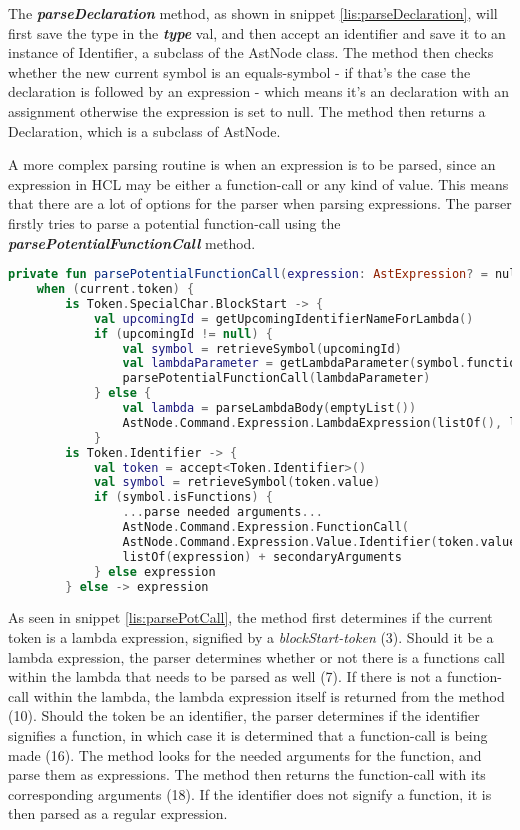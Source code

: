 The \textbf{\textit{parseDeclaration}} method, as shown in snippet \ref{lis:parseDeclaration}, will first save the type in the \textbf{\textit{type}} val, and then accept an identifier and save it to an instance of Identifier, a subclass of the AstNode class. 
The method then checks whether the new current symbol is an equals-symbol - if that's the case the declaration is followed by an expression - which means it's an declaration with an assignment otherwise the expression is set to null. 
The method then returns a Declaration, which is a subclass of AstNode.  

A more complex parsing routine is when an expression is to be parsed, since an expression in HCL may be either a function-call or any kind of value.
This means that there are a lot of options for the parser when parsing expressions.
The parser firstly tries to parse a potential function-call using the \textbf{\textit{parsePotentialFunctionCall}} method.

\begin{lstlisting}[language=Kotlin,label=lis:parsePotCall,caption=A simplified version of the parsePotentialFunctionCall method from the parser.]
private fun parsePotentialFunctionCall(expression: AstExpression? = null): AstExpression =
    when (current.token) {
        is Token.SpecialChar.BlockStart -> {
            val upcomingId = getUpcomingIdentifierNameForLambda()
            if (upcomingId != null) {
                val symbol = retrieveSymbol(upcomingId)
                val lambdaParameter = getLambdaParameter(symbol.functions, 0)
                parsePotentialFunctionCall(lambdaParameter)
            } else {
                val lambda = parseLambdaBody(emptyList())
                AstNode.Command.Expression.LambdaExpression(listOf(), lambda.type, lambda.lambdaBody)
            }
        is Token.Identifier -> {
            val token = accept<Token.Identifier>()
            val symbol = retrieveSymbol(token.value)
            if (symbol.isFunctions) {
        	    ...parse needed arguments...
        	    AstNode.Command.Expression.FunctionCall(
        	    AstNode.Command.Expression.Value.Identifier(token.value),
        	    listOf(expression) + secondaryArguments
            } else expression
        } else -> expression
\end{lstlisting}

As seen in snippet \ref{lis:parsePotCall}, the method first determines if the current token is a lambda expression, signified by a \textit{blockStart-token} (3).
Should it be a lambda expression, the parser determines whether or not there is a functions call within the lambda that needs to be parsed as well (7).
If there is not a function-call within the lambda, the lambda expression itself is returned from the method (10). 
Should the token be an identifier, the parser determines if the identifier signifies a function, in which case it is determined that a function-call is being made (16).
The method looks for the needed arguments for the function, and parse them as expressions.
The method then returns the function-call with its corresponding arguments (18).
If the identifier does not signify a function, it is then parsed as a regular expression.

